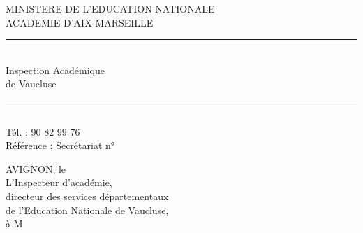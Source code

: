
\noindent\begin{minipage}[t]{.48\linewidth}\centering
MINISTERE DE L’EDUCATION NATIONALE\\
ACADEMIE D’AIX-MARSEILLE\\
\rule{2em}{.3pt}\\[.5em]
Inspection Académique\\
de Vaucluse\\
\rule{2em}{.3pt}\\[.5em]
Tél. : 90 82 99 76\\[.5em]
Référence : Secrétariat n°
\end{minipage}\hfill
\begin{minipage}[t]{.48\linewidth}
AVIGNON, le\\[2.5em]
L’Inspecteur d’académie,\\
directeur des services départementaux\\
de l’Education Nationale de Vaucluse,\\[2em]
à M
\end{minipage}

